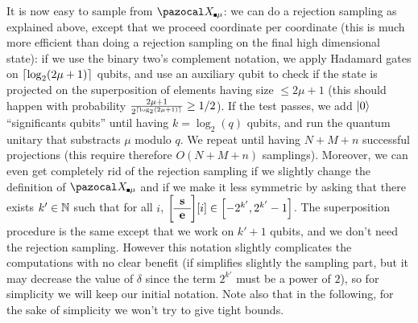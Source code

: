 {  \begin{remark}\label{rq:sampleXCube}
    It is now easy to sample from $\ccXCube[\mu]$: we can do a rejection sampling as explained above, except that we proceed coordinate per coordinate (this is much more efficient than doing a rejection sampling on the final high dimensional state): if we use the binary two's complement notation, we apply Hadamard gates on $\lceil\log_2(2\mu+1)\rceil$ qubits, and use an auxiliary qubit to check if the state is projected on the superposition of elements having size $\leq 2\mu+1$ (this should happen with probability $\frac{2\mu+1}{2^{\lceil\log_2(2\mu+1)\rceil}} \geq 1/2$). If the test passes, we add $\ket{0}$ ``significants qubits'' until having $ k = \log_2(q)$ qubits, and run the quantum unitary that substracts $\mu$ modulo $q$. We repeat until having $N+M+n$ successful projections (this require therefore $O(N+M+n)$ samplings). Moreover, we can even get completely rid of the rejection sampling if we slightly change the definition of $\ccXCube[\mu]$ and if we make it less symmetric by asking that there exists $k' \in \mathbb{N}$ such that for all $i$, $\SmallBlockMatrix{\vect{s}}{\vect{e}}[i] \in \left[-2^{k'},2^{k'}-1\right]$. The superposition procedure is the same except that we work on $k'+1$ qubits, and we don't need the rejection sampling. However this notation slightly complicates the computations with no clear benefit (if simplifies slightly the sampling part, but it may decrease the value of $\delta$ since the term $2^{k'}$ must be a power of $2$), so for simplicity we will keep our initial notation. Note also that in the following, for the sake of simplicity we won't try to give tight bounds.
  \end{remark}

}
